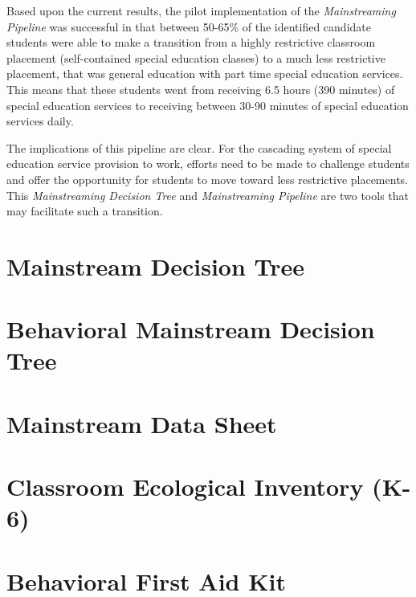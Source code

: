 \documentclass[twoside]{article}
\begin{document}
Based upon the current results, the pilot implementation of the \textit{Mainstreaming Pipeline} was successful in that between 50-65\% of the identified candidate students were able to make a transition from a highly restrictive classroom placement (self-contained special education classes) to a much less restrictive placement, that was general education with part time special education services. This means that these students went from receiving 6.5 hours (390 minutes) of special education services to receiving between 30-90 minutes of special education services daily. 

The implications of this pipeline are clear. For the cascading system of special education service provision to work, efforts need to be made to challenge students and offer the opportunity for students to move toward less restrictive placements. This \textit{Mainstreaming Decision Tree} and \textit{Mainstreaming Pipeline} are two tools that may facilitate such a transition. 

\printbibliography
\clearpage
\appendix
{}
\chapter{Mainstream Decision Tree}
\label{Appendix1}

\chapter{Behavioral Mainstream Decision Tree}
\label{Appendix2}

\chapter{Mainstream Data Sheet} 
\label{Appendix3}

\chapter{Classroom Ecological Inventory (K-6)}
\label{Appendix4}

\chapter{Behavioral First Aid Kit}
\label{Appendix5}

%
\end{document}
